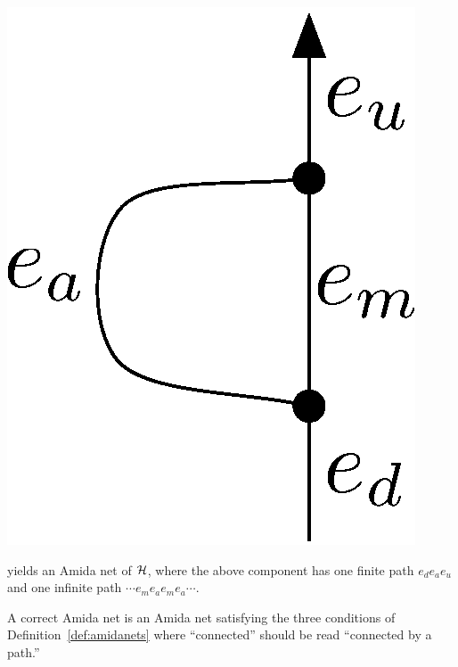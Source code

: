 \begin{definition}
\begin{itemize}
\begin{center}
	 \includegraphics[scale=0.4]{oneedge_amida.eps}
	\end{center}
       yields an Amida net of $\mathcal{H}$,
       where the above component has
       one finite path $e_de_ae_u$
       and one infinite path $\cdots e_m e_a e_m e_a \cdots$.
\end{itemize}
 \end{definition}

 \begin{definition}
  A correct Amida net is an Amida net satisfying the three conditions
  of Definition~\ref{def:amidanets} where ``connected'' should be read
  ``connected by a path.''
 \end{definition}

